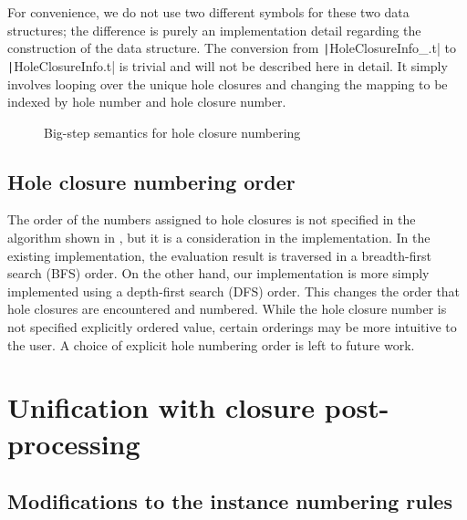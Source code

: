 For convenience, we do not use two different symbols for these two data structures; the difference is purely an implementation detail regarding the construction of the data structure. The conversion from \texttt|HoleClosureInfo_.t| to \texttt|HoleClosureInfo.t| is trivial and will not be described here in detail. It simply involves looping over the unique hole closures and changing the mapping to be indexed by hole number and hole closure number.

\begin{figure}
  \centering
  \begin{mdframed}
    \begin{singlespace}
      
    \end{singlespace}
  \end{mdframed}
  \caption{Big-step semantics for hole closure numbering}
  \label{fig:big-step-renumber-new-rules}
\end{figure}

\subsection{Hole closure numbering order}
\label{sec:numbering-order}

The order of the numbers assigned to hole closures is not specified in the algorithm shown in , but it is a consideration in the implementation. In the existing implementation, the evaluation result is traversed in a breadth-first search (BFS) order. On the other hand, our implementation is more simply implemented using a depth-first search (DFS) order. This changes the order that hole closures are encountered and numbered. While the hole closure number is not specified explicitly ordered value, certain orderings may be more intuitive to the user. A choice of explicit hole numbering order is left to future work.

\section{Unification with closure post-processing}
\label{sec:renumbering_memoization}

\subsection{Modifications to the instance numbering rules}
\label{sec:memoization-instance-numbering}

